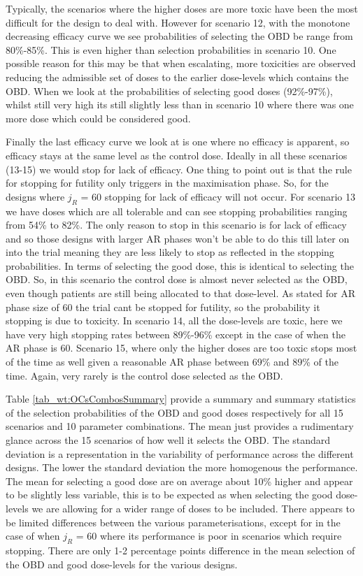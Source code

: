 Typically, the scenarios where the higher doses are more toxic have been the most difficult for the design to deal with. However for scenario 12, with the monotone decreasing efficacy curve we see probabilities of selecting the OBD be range from 80\%-85\%. This is even higher than selection probabilities in scenario 10. One possible reason for this may be that when escalating, more toxicities are observed reducing the admissible set of doses to the earlier dose-levels which contains the OBD. When we look at the probabilities of selecting good doses (92\%-97\%), whilst still very high its still slightly less than in scenario 10 where there was one more dose which could be considered good. 

Finally the last efficacy curve we look at is one where no efficacy is apparent, so efficacy stays at the same level as the control dose. Ideally in all these scenarios (13-15) we would stop for lack of efficacy. One thing to point out is that the rule for stopping for futility only triggers in the maximisation phase. So, for the designs where $j_R$ = 60 stopping for lack of efficacy will not occur. For scenario 13 we have doses which are all tolerable and can see stopping probabilities ranging from 54\% to 82\%. The only reason to stop in this scenario is for lack of efficacy and so those designs with larger AR phases won't be able to do this till later on into the trial meaning they are less likely to stop as reflected in the stopping probabilities. In terms of selecting the good dose, this is identical to selecting the OBD. So, in this scenario the control dose is almost never selected as the OBD, even though patients are still being allocated to that dose-level. As stated for AR phase size of 60 the trial cant be stopped for futility, so the probability it stopping is due to toxicity. In scenario 14, all the dose-levels are toxic, here we have very high stopping rates between 89\%-96\% except in the case of when the AR phase is 60. Scenario 15, where only the higher doses are too toxic stops most of the time as well given a reasonable AR phase between 69\% and 89\% of the time. Again, very rarely is the control dose selected as the OBD. 

Table \ref{tab_wt:OCsCombosSummary} provide a summary and summary statistics of the selection probabilities of the OBD and good doses respectively for all 15 scenarios and 10 parameter combinations. The mean just provides a rudimentary glance across the 15 scenarios of how well it selects the OBD. The standard deviation is a representation in the variability of performance across the different designs. The lower the standard deviation the more homogenous the performance. The mean for selecting a good dose are on average about 10\% higher and appear to be slightly less variable, this is to be expected as when selecting the good dose-levels we are allowing for a wider range of doses to be included. There appears to be limited differences between the various parameterisations, except for in the case of when $j_R$ = 60 where its performance is poor in scenarios which require stopping. There are only 1-2 percentage points difference in the mean selection of the OBD and good dose-levels for the various designs. 

